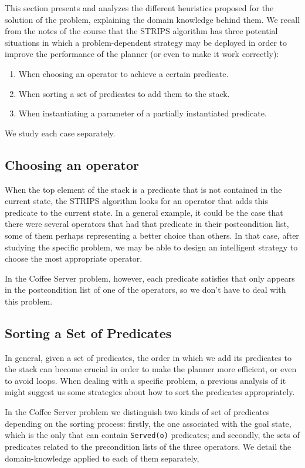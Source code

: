 \documentclass[12pt,a4paper,oneside]{article}
\numberwithin{equation}{section}
\numberwithin{equation}{section}
\theoremstyle{definition}
\begin{document}
This section presents and analyzes the different heuristics proposed for the solution of the problem, explaining the domain knowledge behind them. We recall from the notes of the course\cite{notes} that the STRIPS algorithm has three potential situations in which a problem-dependent strategy may be deployed in order to improve the performance of the planner (or even to make it work correctly):
\begin{enumerate}
	\item When choosing an operator to achieve a certain predicate.
	\item When sorting a set of predicates to add them to the stack.
	\item When instantiating a parameter of a partially instantiated predicate.
\end{enumerate}
We study each case separately.

\subsection{Choosing an operator} \label{Choosing an Operator}

When the top element of the stack is a predicate that is not contained in the current state, the STRIPS algorithm looks for an operator that adds this predicate to the current state. In a general example, it could be the case that there were several operators that had that predicate in their postcondition list, some of them perhaps representing a better choice than others. In that case, after studying the specific problem, we may be able to design an intelligent strategy to choose the most appropriate operator. 


In the Coffee Server problem, however, each predicate satisfies that only appears in the postcondition list of one of the operators, so we don’t have to deal with this problem.

\subsection{Sorting a Set of Predicates} \label{Sorting a Set of Predicates}

In general, given a set of predicates, the order in which we add its predicates to the stack can become crucial in order to make the planner more efficient, or even to avoid loops. When dealing with a specific problem, a previous analysis of it might suggest us some strategies about how to sort the predicates appropriately.


In the Coffee Server problem we distinguish two kinds of set of predicates depending on the sorting process: firstly, the one associated with the goal state, which is the only that can contain \texttt{Served(o)} predicates; and secondly, the sets of predicates related to the precondition lists of the three operators. We detail the domain-knowledge applied to each of them separately, 
\end{document}

